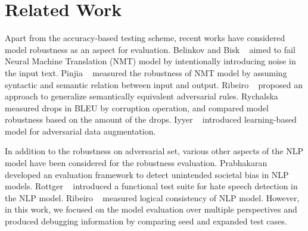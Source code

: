 \vspace{-6pt}
\section{Related Work}

%
Apart from the accuracy-based testing
scheme, recent works have considered model robustness as an
aspect for evaluation. Belinkov and Bisk
\textit{\etal}~\cite{belinkov2018breaknmt} aimed to fail Neural Machine
Translation (NMT) model by intentionally introducing noise in the input
text. Pinjia
\textit{\etal}~\cite{pinjia2020structinvtestingnmt,pinjia2020testnmtrt}
measured the robustness of NMT model by assuming syntactic and semantic relation between input and output. Ribeiro
\textit{\etal}~\cite{ribeiro2018sear} proposed an approach to
generalize semantically equivalent adversarial rules. Rychalska \textit{\etal}~\cite{rychalska2019wildnlp} measured drops in
BLEU by corruption operation, and compared model robustness
based on the amount of the drops. Iyyer
\textit{\etal}~\cite{iyyer2018adversarial} introduced learning-based
model for adversarial data augmentation.

In addition to the
robustness on adversarial set, various other aspects of the NLP model have been
considered for the robustness evaluation. Prabhakaran
\textit{\etal}~\cite{prabhakaran2019fairness} developed an evaluation
framework to detect unintended societal bias in NLP models. Rottger
\textit{\etal}~\cite{rottger2020hatecheck} introduced a functional
test suite for hate speech detection in the NLP model.  Ribeiro
\textit{\etal}~\cite{ribeiro2019consistencyeval} measured logical
consistency of NLP model. However, in this work, we focused on the model evaluation over multiple perspectives and produced debugging information by comparing seed and expanded test cases.

